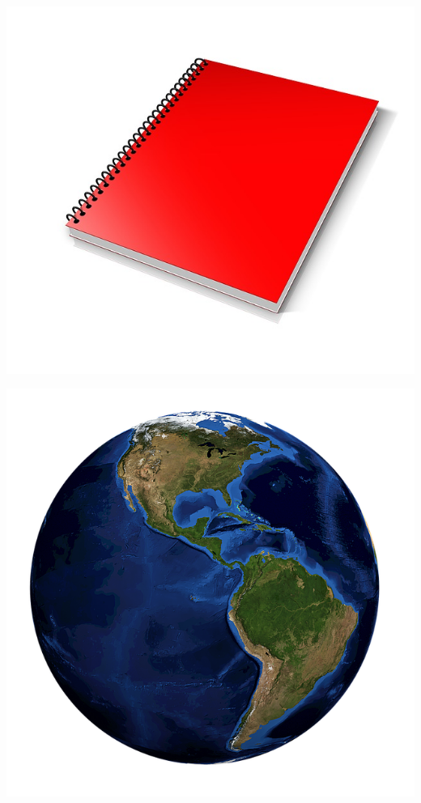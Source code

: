 \begin{titlepage}
\begin{center}
\thispagestyle{plain}
\vspace*{1.0cm}
\includegraphics[scale=0.5]{./graphics/LogoOne}

\includegraphics[scale=0.5]{./graphics/LogoTwo}


\end{center}
\end{titlepage}
